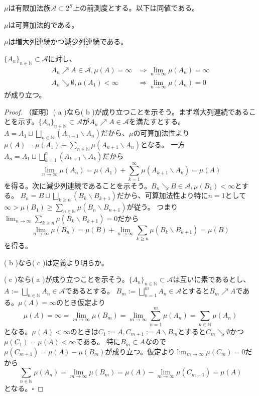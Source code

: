 \documentclass[../root.tex]{subfiles}
\begin{document}
\begin{Prop}{}{}
$ \mu $は有限加法族$ \mathscr{A}\subset 2^{S} $上の前測度とする。以下は同値である。
\begin{EnumEquiv}
\item $ \mu $は可算加法的である。
\item $ \mu $は増大列連続かつ減少列連続である。
\item $ \lbrace A_{n} \rbrace_{n\in\mathbb{N}}\subset\mathscr{A} $に対し、
\begin{align*}
A_{n}\nearrow A\in\mathscr{A}, \mu( A )=\infty &\Rightarrow \lim_{n\rightarrow\infty}\mu( A_{n} )=\infty \\
A_{n}\searrow \emptyset, \mu( A_{1} )\lt\infty &\Rightarrow \lim_{n\rightarrow\infty}\mu( A_{n} )=0
\end{align*}
が成り立つ。
\end{EnumEquiv}
\end{Prop}

\begin{proof}
（証明）( a )なら( b )が成り立つことを示そう。まず増大列連続であることを示す。$ \lbrace A_{n} \rbrace_{n\in\mathbb{N}}\subset\mathscr{A} $が$ A_{n}\nearrow A\in\mathscr{A} $を満たすとする。
$ A=A_{1}\sqcup\bigsqcup_{n\in\mathbb{N}}( A_{n+1}\backslash A_{n} ) $だから、$ \mu $の可算加法性より$ \mu( A )=\mu( A_{1} )+\sum_{n\in\mathbb{N}}\mu( A_{n+1}\backslash A_{n} ) $となる。
一方$ A_{n}=A_{1}\sqcup\bigsqcup_{k=1}^{n}( A_{k+1}\backslash A_{k} ) $だから
\[ \lim_{n\rightarrow\infty}\mu( A_{n} )=\mu( A_{1} )+\sum_{k=1}^{\infty}\mu( A_{k+1}\backslash A_{k} )=\mu( A ) \]
を得る。次に減少列連続であることを示そう。$ B_{n}\searrow B\in\mathscr{A}, \mu( B_{1} )\lt\infty $とする。
$ B_{n}=B\sqcup\bigsqcup_{k\ge n}( B_{k}\backslash B_{k+1} ) $だから、可算加法性より特に$ n=1 $として$ \infty\gt\mu( B_{1} )\ge\sum_{n\in\mathbb{N}}\mu( B_{n}\backslash B_{n+1} ) $が従う。
つまり$ \lim_{n\rightarrow\infty}\sum_{k\ge n}\mu( B_{k}\backslash B_{k+1} )=0 $だから
\[ \lim_{n\rightarrow\infty}\mu( B_{n} )=\mu( B )+\lim_{n\rightarrow\infty}\sum_{k\ge n}\mu( B_{k}\backslash B_{k+1} )=\mu( B ) \]
を得る。

( b )なら( c )は定義より明らか。

( c )なら( a )が成り立つことを示そう。$ \lbrace A_{n} \rbrace_{n\in\mathbb{N}}\subset\mathscr{A} $は互いに素であるとし、$ A:=\bigsqcup_{n\in\mathbb{N}}A_{n}\in\mathscr{A} $であるとする。
$ B_{m}:=\bigsqcup_{n=1}^{m}A_{n}\in\mathscr{A} $とすると$ B_{m}\nearrow A $である。$ \mu( A )=\infty $のとき仮定より
\[ \mu( A )=\infty=\lim_{m\rightarrow\infty}\mu( B_{m} )=\lim_{m\rightarrow\infty}\sum_{n=1}^{m}\mu( A_{n} )=\sum_{n\in\mathbb{N}}\mu( A_{n} ) \]
となる。$ \mu( A )\lt\infty $のときは$ C_{1}:=A, C_{m+1}:=A\backslash B_{m} $とすると$ C_{m}\searrow\emptyset $かつ$ \mu( C_{1} )=\mu( A )\lt\infty $である。
特に$ B_{m}\subset A $なので$ \mu( C_{m+1} )=\mu( A )-\mu( B_{m} ) $が成り立つ。仮定より$ \lim_{m\rightarrow\infty}\mu( C_{m} )=0 $だから
\[ \sum_{n\in\mathbb{N}}\mu( A_{n} )=\lim_{m\rightarrow\infty}\mu( B_{m} )=\mu( A )-\lim_{m\rightarrow\infty}\mu( C_{m+1} )=\mu( A ) \]
となる。$ \square $
\end{proof}
\end{document}
